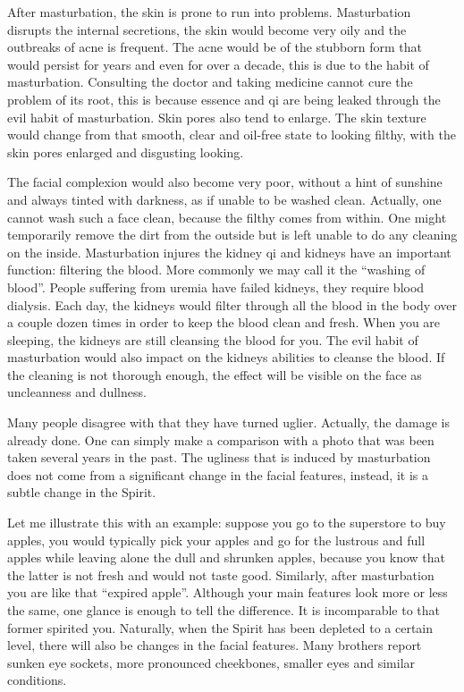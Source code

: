 \documentclass[
]{book}
\begin{document}
After masturbation, the skin is prone to run into problems. Masturbation disrupts the internal secretions, the skin would become very oily and the outbreaks of acne is frequent. The acne would be of the stubborn form that would persist for years and even for over a decade, this is due to the habit of masturbation. Consulting the doctor and taking medicine cannot cure the problem of its root, this is because essence and qi are being leaked through the evil habit of masturbation. Skin pores also tend to enlarge. The skin texture would change from that smooth, clear and oil-free state to looking filthy, with the skin pores enlarged and disgusting looking.

The facial complexion would also become very poor, without a hint of sunshine and always tinted with darkness, as if unable to be washed clean. Actually, one cannot wash such a face clean, because the filthy comes from within. One might temporarily remove the dirt from the outside but is left unable to do any cleaning on the inside. Masturbation injures the kidney qi and kidneys have an important function: filtering the blood. More commonly we may call it the ``washing of blood''. People suffering from uremia have failed kidneys, they require blood dialysis. Each day, the kidneys would filter through all the blood in the body over a couple dozen times in order to keep the blood clean and fresh. When you are sleeping, the kidneys are still cleansing the blood for you. The evil habit of masturbation would also impact on the kidneys abilities to cleanse the blood. If the cleaning is not thorough enough, the effect will be visible on the face as uncleanness and dullness.

Many people disagree with that they have turned uglier. Actually, the damage is already done. One can simply make a comparison with a photo that was been taken several years in the past. The ugliness that is induced by masturbation does not come from a significant change in the facial features, instead, it is a subtle change in the Spirit.

Let me illustrate this with an example: suppose you go to the superstore to buy apples, you would typically pick your apples and go for the lustrous and full apples while leaving alone the dull and shrunken apples, because you know that the latter is not fresh and would not taste good. Similarly, after masturbation you are like that ``expired apple''. Although your main features look more or less the same, one glance is enough to tell the difference. It is incomparable to that former spirited you. Naturally, when the Spirit has been depleted to a certain level, there will also be changes in the facial features. Many brothers report sunken eye sockets, more pronounced cheekbones, smaller eyes and similar conditions.
\end{document}
